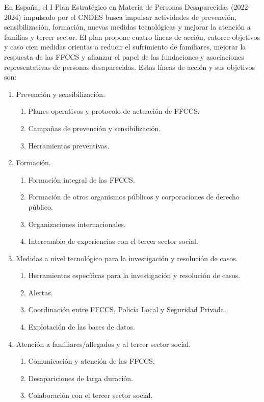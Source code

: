 En España, el I Plan Estratégico en Materia de Personas Desaparecidas (2022-2024) \cite{plan_desaparecidos_2022} impulsado por el CNDES busca impulsar actividades de prevención, sensibilización, formación, nuevas medidas tecnológicas y mejorar la atención a familias y tercer sector. El plan propone cuatro líneas de acción, catorce objetivos y caso cien medidas orientas a reducir el sufrimiento de familiares, mejorar la respuesta de las FFCCS y afianzar el papel de las fundaciones y asociaciones representativas de personas desaparecidas. Estas líneas de acción y sus objetivos son:
\begin{enumerate}
  \item[I.] Prevención y sensibilización.
  \begin{enumerate}
    \item [1.] Planes operativos y protocolo de actuación de FFCCS.
    \item [2.] Campañas de prevención y sensibilización.
    \item [3.] Herramientas preventivas.
  \end{enumerate}
  
  \item[II.] Formación.
  \begin{enumerate}
    \item [4.] Formación integral de las FFCCS.
    \item [5.] Formación de otros organismos públicos y corporaciones de derecho público.
    \item [6.] Organizaciones internacionales.
    \item [7.] Intercambio de experiencias con el tercer sector social.
  \end{enumerate}
  
  \item[III.] Medidas a nivel tecnológico para la investigación y resolución de casos.
  \begin{enumerate}
    \item [8.] Herramientas específicas para la investigación y resolución de casos.
    \item [9.] Alertas.
    \item [10.] Coordinación entre FFCCS, Policía Local y Seguridad Privada.
    \item [11.] Explotación de las bases de datos.
  \end{enumerate}
  
  \item[IV.] Atención a familiares/allegados y al tercer sector social.
  \begin{enumerate}
    \item [12.] Comunicación y atención de las FFCCS.
    \item [13.] Desapariciones de larga duración.
    \item [14.] Colaboración con el tercer sector social.
  \end{enumerate}
\end{enumerate}

